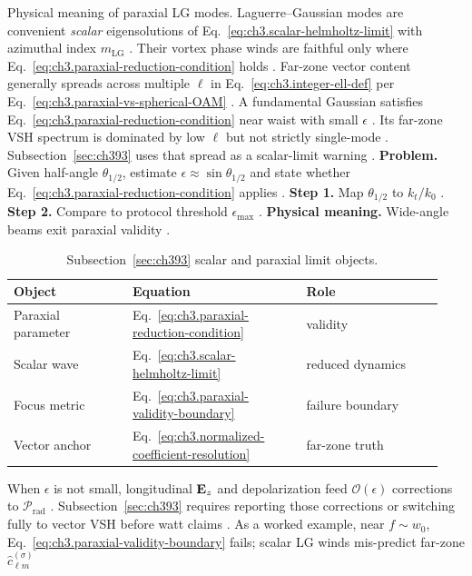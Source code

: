 Physical meaning of paraxial LG modes. Laguerre--Gaussian modes are convenient \emph{scalar} eigensolutions of Eq.~\eqref{eq:ch3.scalar-helmholtz-limit} with azimuthal index
\(m_{\mathrm{LG}}\) \cite{allen1992}. Their vortex phase winds are faithful only where
Eq.~\eqref{eq:ch3.paraxial-reduction-condition} holds \cite{allen1992}. Far-zone vector content generally spreads across
multiple \(\ell\) in Eq.~\eqref{eq:ch3.integer-ell-def} per Eq.~\eqref{eq:ch3.paraxial-vs-spherical-OAM} \cite{hansen1988}.
A fundamental Gaussian satisfies Eq.~\eqref{eq:ch3.paraxial-reduction-condition} near waist with small \(\epsilon\) \cite{jackson1999}.
Its far-zone VSH spectrum is dominated by low \(\ell\) but not strictly single-mode \cite{hansen1988}. Subsection~\ref{sec:ch393}
uses that spread as a scalar-limit warning \cite{stratton1941}.
\textbf{Problem.} Given half-angle \(\theta_{1/2}\), estimate \(\epsilon\approx\sin\theta_{1/2}\) and state whether
Eq.~\eqref{eq:ch3.paraxial-reduction-condition} applies \cite{jackson1999}.
\textbf{Step 1.} Map \(\theta_{1/2}\) to \(k_{t}/k_{0}\) \cite{jackson1999}.
\textbf{Step 2.} Compare to protocol threshold \(\epsilon_{\max}\) \cite{harrington2001}.
\textbf{Physical meaning.} Wide-angle beams exit paraxial validity \cite{allen1992}.
\begin{table}[t]
\centering
\caption{Subsection~\ref{sec:ch393} scalar and paraxial limit objects.}
\label{tab:ch3.393-limit-objects}
\small
\begin{tabular}{@{}p{0.26\linewidth}p{0.38\linewidth}p{0.30\linewidth}@{}}
\toprule
Object & Equation & Role \\
\midrule
Paraxial parameter & Eq.~\eqref{eq:ch3.paraxial-reduction-condition} & validity \\
Scalar wave & Eq.~\eqref{eq:ch3.scalar-helmholtz-limit} & reduced dynamics \\
Focus metric & Eq.~\eqref{eq:ch3.paraxial-validity-boundary} & failure boundary \\
Vector anchor & Eq.~\eqref{eq:ch3.normalized-coefficient-resolution} & far-zone truth \\
\bottomrule
\end{tabular}
\end{table}
When \(\epsilon\) is not small, longitudinal \(\mathbf{E}_{z}\) and depolarization feed \(\mathcal{O}(\epsilon)\) corrections to
\(\mathcal{P}_{\mathrm{rad}}\) \cite{jackson1999}. Subsection~\ref{sec:ch393} requires reporting those corrections
or switching fully to vector VSH before watt claims \cite{hansen1988}.
As a worked example, near \(f\sim w_{0}\), Eq.~\eqref{eq:ch3.paraxial-validity-boundary} fails; scalar LG winds mis-predict far-zone \(\widehat{c}_{\ell m}^{(\sigma)}\)
